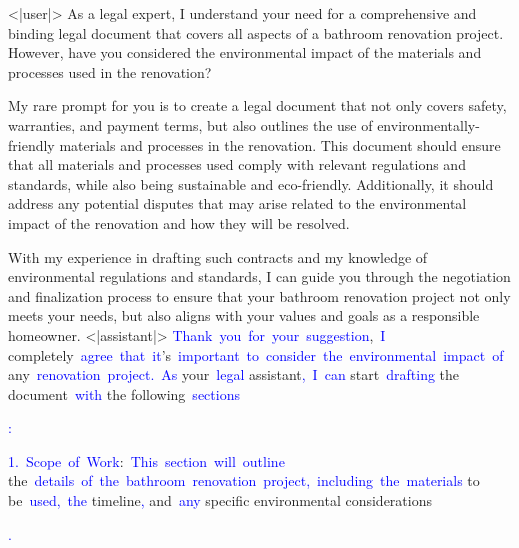 \documentclass{article}
\begin{document}
\begin{tcolorbox}[colframe=black,colback=white]
<|user|>
As a legal expert, I understand your need for a comprehensive and binding legal document that covers all aspects of a bathroom renovation project. However, have you considered the environmental impact of the materials and processes used in the renovation? 

My rare prompt for you is to create a legal document that not only covers safety, warranties, and payment terms, but also outlines the use of environmentally-friendly materials and processes in the renovation. This document should ensure that all materials and processes used comply with relevant regulations and standards, while also being sustainable and eco-friendly. Additionally, it should address any potential disputes that may arise related to the environmental impact of the renovation and how they will be resolved.

With my experience in drafting such contracts and my knowledge of environmental regulations and standards, I can guide you through the negotiation and finalization process to ensure that your bathroom renovation project not only meets your needs, but also aligns with your values and goals as a responsible homeowner.
<|assistant|>
\textcolor{blue}{Thank}\textcolor{blue}{~you}\textcolor{blue}{~for}\textcolor{blue}{~your}\textcolor{blue}{~suggestion},\textcolor{blue}{~I} completely\textcolor{blue}{~agree}\textcolor{blue}{~that}\textcolor{blue}{~it}'s\textcolor{blue}{~important}\textcolor{blue}{~to}\textcolor{blue}{~consider}\textcolor{blue}{~the}\textcolor{blue}{~environmental}\textcolor{blue}{~impact}\textcolor{blue}{~of} any\textcolor{blue}{~renovation}\textcolor{blue}{~project}\textcolor{blue}{.}\textcolor{blue}{~As} your\textcolor{blue}{~legal} assistant\textcolor{blue}{,}\textcolor{blue}{~I}\textcolor{blue}{~can} start\textcolor{blue}{~drafting} the document\textcolor{blue}{~with} the following\textcolor{blue}{~sections}\textcolor{blue}{:

}\textcolor{blue}{1}\textcolor{blue}{.}\textcolor{blue}{~Scope}\textcolor{blue}{~of}\textcolor{blue}{~Work}:\textcolor{blue}{~This}\textcolor{blue}{~section}\textcolor{blue}{~will}\textcolor{blue}{~outline} the\textcolor{blue}{~details}\textcolor{blue}{~of}\textcolor{blue}{~the}\textcolor{blue}{~bathroom}\textcolor{blue}{~renovation}\textcolor{blue}{~project}\textcolor{blue}{,}\textcolor{blue}{~including}\textcolor{blue}{~the}\textcolor{blue}{~materials} to be\textcolor{blue}{~used}\textcolor{blue}{,}\textcolor{blue}{~the} timeline\textcolor{blue}{,} and\textcolor{blue}{~any} specific environmental considerations\textcolor{blue}{.

}
\end{tcolorbox}
\end{document}
